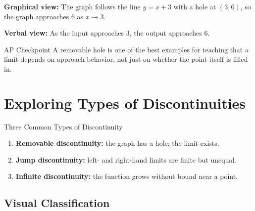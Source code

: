 \documentclass[11pt]{article}
\newcommand{\apcheckpoint}[1]{%
\begin{skillbox}{AP Checkpoint}
#1
\end{skillbox}
}
\begin{document}
\textbf{Graphical view:}
The graph follows the line $y=x+3$ with a hole at $(3,6)$, so the graph approaches $6$ as $x\to 3$.

\textbf{Verbal view:}
As the input approaches $3$, the output approaches $6$.

\bigskip

\apcheckpoint{A removable hole is one of the best examples for teaching that a limit depends on approach behavior, not just on whether the point itself is filled in.}

%
%
%
\section{Exploring Types of Discontinuities}

\begin{theorybox}{Three Common Types of Discontinuity}
\begin{enumerate}
    \item \textbf{Removable discontinuity:} the graph has a hole; the limit exists.
    \item \textbf{Jump discontinuity:} left- and right-hand limits are finite but unequal.
    \item \textbf{Infinite discontinuity:} the function grows without bound near a point.
\end{enumerate}
\end{theorybox}

\subsection{Visual Classification}
\end{document}

